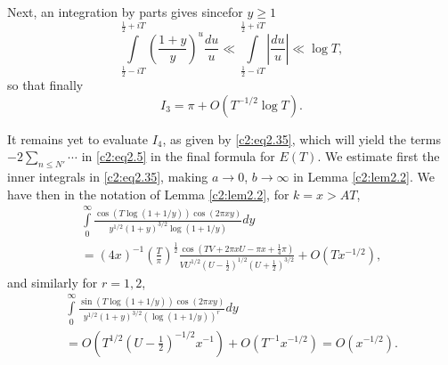 Next, an integration by parts gives
{}
since\pageoriginale for $y\geq 1$
$$
\int\limits_{\frac{1}{2} - iT}^{\frac{1}{2} +iT} \left(\frac{1+y}{y}
\right)^u \frac{du}{u} \ll \int\limits_{\frac{1}{2}- iT}^{\frac{1}{2}+
iT} \left|\frac{du}{u} \right|  \ll \log T,
$$
so that finally
\begin{equation}
  I_3 = \pi + O(T^{- 1/2} \log T). \label{c2:eq2.61}
\end{equation}

It remains yet to evaluate $I_4$, as given by \eqref{c2:eq2.35}, which
will yield the terms $-2 \sum\limits_{n \leq N'} \cdots $ in \eqref{c2:eq2.5}
in the final formula for $E(T)$. We estimate first the inner integrals
in \eqref{c2:eq2.35}, making $a \to 0$, $b \to \infty$ in Lemma
\ref{c2:lem2.2}. We have then in the notation of Lemma
\ref{c2:lem2.2}, for $k= x> AT$,
\begin{multline*}
  \int\limits_0^\infty \frac{\cos (T \log (1+ 1/y)) \cos (2 \pi
    xy)}{y^{1/2} (1+y)^{3/2} \log (1+ 1/y)} dy\\
  = (4x)^{-1} \left(\frac{T}{\pi} \right)^{\frac{1}{2}} \frac{\cos (TV
    + 2 \pi x U - \pi x + \frac{1}{4} \pi)}{VU^{1/2} \left(U-
    \frac{1}{2}\right)^{1/2} \left(U + \frac{1}{2}\right)^{3/2}}+ O
  \left( T x^{-1/2}\right),
\end{multline*}
and similarly for $r= 1, 2$,
\begin{multline*}
  \int\limits_0^\infty \frac{\sin (T \log (1+ 1/y))\cos (2 \pi x
    y)}{y^{1/2} (1+ y)^{3/2} (\log (1+ 1/y))^r} dy\\
  = O \left(T^{1/2} \left(U- \frac{1}{2}\right)^{-1/2}x^{-1}\right) +
  O\left(T^{-1} x^{-1/2} \right)= O(x^{-1/2}).
\end{multline*}


